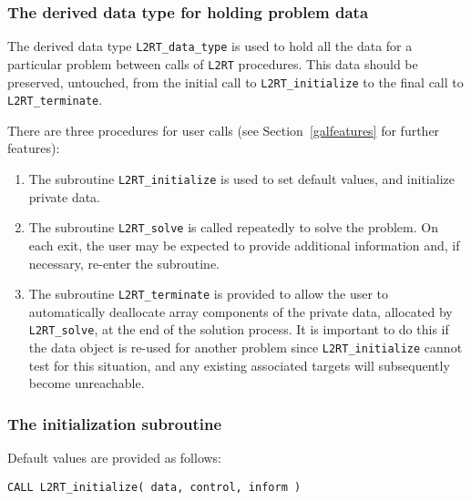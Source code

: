 \documentclass{galahad}
\newcommand{\packagename}{L2\-RT}
\begin{document}

\subsubsection{The derived data type for holding problem data}\label{typedata}
The derived data type 
{\tt \packagename\_data\_type} 
is used to hold all the data for a particular problem between calls of 
{\tt \packagename} procedures. 
This data should be preserved, untouched, from the initial call to 
{\tt \packagename\_initialize}
to the final call to
{\tt \packagename\_terminate}.


\galarguments
There are three procedures for user calls
(see Section~\ref{galfeatures} for further features): 

\begin{enumerate}
\item The subroutine 
      {\tt \packagename\_initialize} 
      is used to set default values, and initialize private data.
\item The subroutine 
      {\tt \packagename\_solve} 
      is called repeatedly to solve the problem. 
      On each exit, the user may be expected to provide additional 
      information and, if necessary, re-enter the subroutine. 
\item The subroutine 
      {\tt \packagename\_terminate} 
      is provided to allow the user to automatically deallocate array 
       components of the private data, allocated by 
       {\tt \packagename\_solve}, 
       at the end of the solution process. 
       It is important to do this if the data object is re-used for another  
       problem since {\tt \packagename\_initialize} cannot test for this 
       situation,  
       and any existing associated targets will subsequently become 
       unreachable. 
\end{enumerate}


\subsubsection{The initialization subroutine}\label{subinit}
 Default values are provided as follows:

\hskip0.5in 
{\tt CALL \packagename\_initialize( data, control, inform )}
\end{document}
